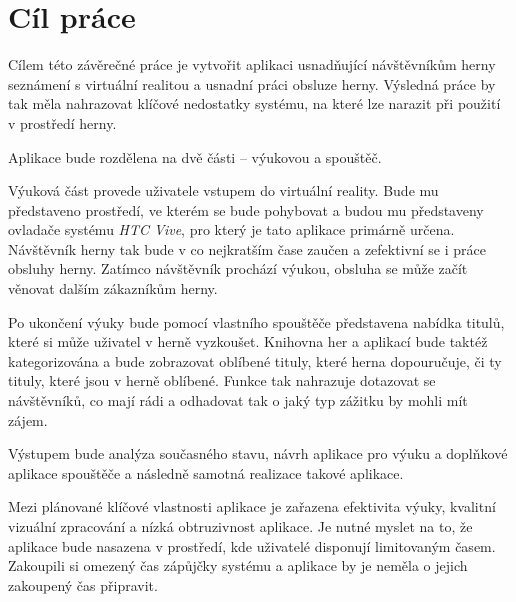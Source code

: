 \section{Cíl práce}\label{cuxedl-pruxe1ce}

Cílem této závěrečné práce je vytvořit aplikaci usnadňující návštěvníkům
herny seznámení s virtuální realitou a usnadní práci obsluze herny.
Výsledná práce by tak měla nahrazovat klíčové nedostatky systému, na
které lze narazit při použití v prostředí herny.

Aplikace bude rozdělena na dvě části -- výukovou a spouštěč.

Výuková část provede uživatele vstupem do virtuální reality. Bude mu
představeno prostředí, ve kterém se bude pohybovat a budou mu
představeny ovladače systému \emph{HTC Vive}, pro který je tato aplikace
primárně určena. Návštěvník herny tak bude v co nejkratším čase zaučen a
zefektivní se i práce obsluhy herny. Zatímco návštěvník prochází výukou,
obsluha se může začít věnovat dalším zákazníkům herny.

Po ukončení výuky bude pomocí vlastního spouštěče představena nabídka
titulů, které si může uživatel v herně vyzkoušet. Knihovna her a
aplikací bude taktéž kategorizována a bude zobrazovat oblíbené tituly,
které herna dopouručuje, či ty tituly, které jsou v herně oblíbené.
Funkce tak nahrazuje dotazovat se návštěvníků, co mají rádi a odhadovat
tak o jaký typ zážitku by mohli mít zájem.

Výstupem bude analýza současného stavu, návrh aplikace pro výuku a
doplňkové aplikace spouštěče a následně samotná realizace takové
aplikace.

Mezi plánované klíčové vlastnosti aplikace je zařazena efektivita výuky,
kvalitní vizuální zpracování a nízká obtruzivnost aplikace. Je nutné
myslet na to, že aplikace bude nasazena v prostředí, kde uživatelé
disponují limitovaným časem. Zakoupili si omezený čas zápůjčky systému a
aplikace by je neměla o jejich zakoupený čas připravit.

